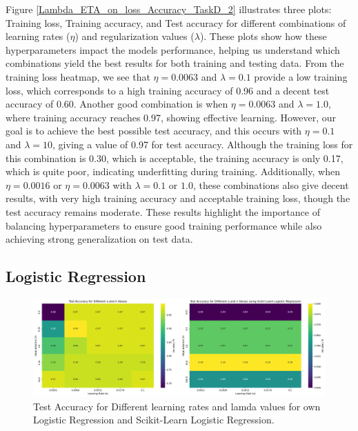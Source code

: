 \documentclass{article}
\newcommand{\0}{\mathbf{0}}
\newcommand{\1}{\mathbf{1}}
\begin{document}
Figure \ref{Lambda_ETA_on_loss_Accuracy_TaskD_2} illustrates three plots: Training loss, Training accuracy, and Test accuracy for different combinations of learning rates (\(\eta\)) and regularization values (\(\lambda\)). These plots show how these hyperparameters impact the models performance, helping us understand which combinations yield the best results for both training and testing data. From the training loss heatmap, we see that \(\eta = 0.0063\) and \(\lambda = 0.1\) provide a low training loss, which corresponds to a high training accuracy of 0.96 and a decent test accuracy of 0.60. Another good combination is when \(\eta = 0.0063\) and \(\lambda = 1.0\), where training accuracy reaches 0.97, showing effective learning. However, our goal is to achieve the best possible test accuracy, and this occurs with \(\eta = 0.1\) and \(\lambda = 10\), giving a value of 0.97 for test accuracy. Although the training loss for this combination is 0.30, which is acceptable, the training accuracy is only 0.17, which is quite poor, indicating underfitting during training. Additionally, when \(\eta = 0.0016\) or \(\eta = 0.0063\) with \(\lambda = 0.1\) or \(1.0\), these combinations also give decent results, with very high training accuracy and acceptable training loss, though the test accuracy remains moderate. These results highlight the importance of balancing hyperparameters to ensure good training performance while also achieving strong generalization on test data.


\subsection{Logistic Regression}


\begin{figure}[h!]
    \centering
    \includegraphics[width=1.2\linewidth]{Accuracy_taskE.png}
    \caption{Test Accuracy for Different learning rates and lamda values for own Logistic Regression and Scikit-Learn Logistic Regression.}
    \label{Accuracy_taskE}
\end{figure}
\end{document}
